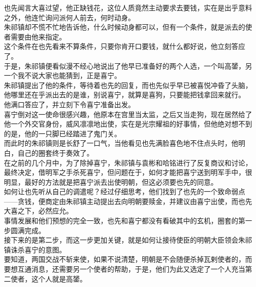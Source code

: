 \begin{multicols}{\theparacolNo}
也先闻言大喜过望，他正缺钱花，这位人质竟然主动要求去要钱，实在是出乎意料之外，他连忙询问派何人前去，何时动身。\\

朱祁镇却不慌不忙地告诉他，什么时候动身都可以，但有一个条件，就是派去的使者需要由他来指定。\\

这个条件在也先看来不算条件，只要你肯开口要钱，就什么都好说，他立刻答应了。\\

于是，朱祁镇便看似漫不经心地说出了他早已准备好的两个人选，一个叫高𨭉，另一个我不说大家也能猜到，正是喜宁。\\

朱祁镇提出了他的条件，等待着也先的回复，而也先似乎早已被喜悦冲昏了头脑，他哪里还在乎派出去的是谁，别说喜宁，就算是喜狗，只要能把钱拿回来就行。\\

他满口答应了，并立刻下令喜宁准备出发。\\

喜宁倒对这一使命很感兴趣，他原本在宫里当太监，之后又当走狗，现在居然给了他一个外交官身份，威风凛凛地出使，实在是光宗耀祖的好事情，但他绝对想不到的是，他的一只脚已经踏进了鬼门关。\\

而此时的朱祁镇则是长舒了一口气，当他看见也先满脸喜色地不住点头时，他明白，自己的圈套终于奏效了。\\

在之前的几个月中，为了除掉喜宁，朱祁镇与袁彬和哈铭进行了反复商议和讨论，最终决定，借明军之手杀死喜宁，但问题在于，如何才能把喜宁送到明军手中，很明显，最好的方法就是把喜宁派去出使明朝，但这必须要也先的同意。\\

如何让也先听从自己的调遣呢？经过仔细思考，他们找到了也先的一个致命弱点——贪钱，便商定由朱祁镇主动提出去向明朝要赎金，并建议由喜宁出使，而也先大喜之下，必然应允。\\

事情发展和他们预想的完全一致，也先和喜宁都没有看破其中的玄机，圈套的第一步圆满完成。\\

接下来的是第二步，而这一步更加关键，就是如何让接待使臣的明朝大臣领会朱祁镇诛杀喜宁的意图。\\

要知道，两国交战不斩来使，如果不说清楚，明朝是不会随便杀掉瓦剌使者的，而要想互通消息，还需要另一个使者的帮助，于是，他们为此又选定了一个人充当第二使者，这个人就是高𨭉。\\


\end{multicols}
